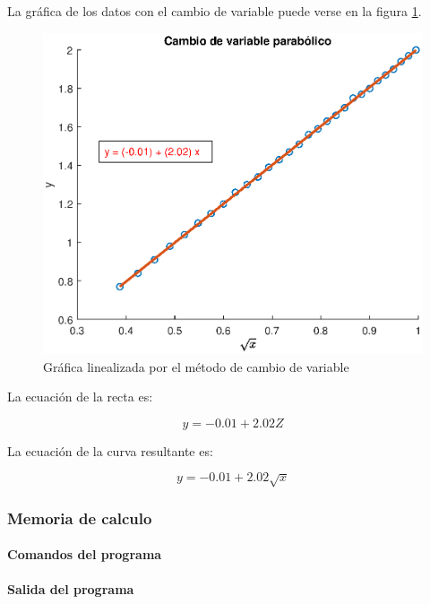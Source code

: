\documentclass[letter,11pt]{article}
\begin{document}
La gráfica de los datos con el cambio de variable puede verse en la figura
\ref{practica34_3}.

\begin{figure}[!h]
\centering
\includegraphics[scale=1.00]{eps/3.4.3.eps}
\caption{Gráfica linealizada por el método de cambio de variable}
\label{practica34_3}
\end{figure}

La ecuación de la recta es:

\begin{equation}
    y = -0.01 + 2.02 Z
\end{equation}

La ecuación de la curva resultante es:

\begin{equation}
    y = -0.01 + 2.02 \sqrt{x}
\end{equation}

\subsubsection{Memoria de calculo}

\paragraph{Comandos del programa}
\begin{alltt}
\footnotesize

\normalsize
\end{alltt}

\paragraph{Salida del programa}
\begin{alltt}
\footnotesize

\normalsize
\end{alltt}
\end{document}
